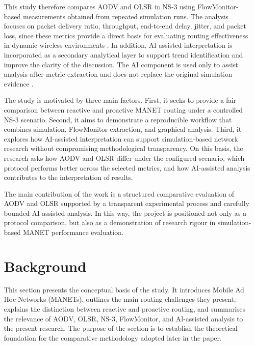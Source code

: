 \documentclass{Academic}
\begin{document}
This study therefore compares AODV and OLSR in NS-3 using FlowMonitor-based measurements obtained from repeated simulation runs. The analysis focuses on packet delivery ratio, throughput, end-to-end delay, jitter, and packet loss, since these metrics provide a direct basis for evaluating routing effectiveness in dynamic wireless environments \parencite{carneiro2009flowmonitor,riley2010ns3,selim2025}. In addition, AI-assisted interpretation is incorporated as a secondary analytical layer to support trend identification and improve the clarity of the discussion. The AI component is used only to assist analysis after metric extraction and does not replace the original simulation evidence \parencite{bhatia2022,duong2024,schuler2021}.

The study is motivated by three main factors. First, it seeks to provide a fair comparison between reactive and proactive MANET routing under a controlled NS-3 scenario. Second, it aims to demonstrate a reproducible workflow that combines simulation, FlowMonitor extraction, and graphical analysis. Third, it explores how AI-assisted interpretation can support simulation-based network research without compromising methodological transparency. On this basis, the research asks how AODV and OLSR differ under the configured scenario, which protocol performs better across the selected metrics, and how AI-assisted analysis contributes to the interpretation of results.

The main contribution of the work is a structured comparative evaluation of AODV and OLSR supported by a transparent experimental process and carefully bounded AI-assisted analysis. In this way, the project is positioned not only as a protocol comparison, but also as a demonstration of research rigour in simulation-based MANET performance evaluation.

\section{Background}

This section presents the conceptual basis of the study. It introduces Mobile Ad Hoc Networks (MANETs), outlines the main routing challenges they present, explains the distinction between reactive and proactive routing, and summarises the relevance of AODV, OLSR, NS-3, FlowMonitor, and AI-assisted analysis to the present research. The purpose of the section is to establish the theoretical foundation for the comparative methodology adopted later in the paper.
\end{document}
